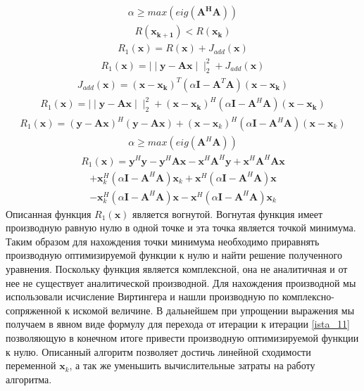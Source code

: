  \begin{align}
 \alpha \geq max(eig(\mathbf{A^HA}))
 \end{align}
 \begin{align}
 R(\mathbf{x_{k+1}})<R(\mathbf{x_k})
 \label{ista_3}
 \end{align}
\begin{align}
 R_1(\mathbf{x})=R(\mathbf{x})+J_{add}(\mathbf{x}) \label{ista_4}
\end{align}
\begin{align}
 R_1(\mathbf{x})=\mid\mid\mathbf{y}-\mathbf{Ax}\mid\mid^2_2+J_{add}(\mathbf{x})\label{ista_5}
\end{align}
\begin{align}
J_{add}(\mathbf{x})=(\mathbf{x-x_k})^T(\alpha \mathbf{I}-\mathbf{A}^T\mathbf{A})(\mathbf{x-x_k})\label{ista_6}
\end{align}
\begin{align}
 R_1(\mathbf{x})=\mid\mid\mathbf{y}-\mathbf{Ax}\mid\mid^2_2+(\mathbf{x-x_k})^H(\alpha \mathbf{I}-\mathbf{A}^H\mathbf{A})(\mathbf{x-x_k}) \label{ista_7}
\end{align}
\begin{align}
 R_1(\mathbf{x})=(\mathbf{y}-\mathbf{Ax})^H(\mathbf{y}-\mathbf{Ax})+(\mathbf{x}-\mathbf{x}_k)^H(\alpha \mathbf{I}-\mathbf{A}^H\mathbf{A})(\mathbf{x}-\mathbf{x}_k) \label{ista_8}
\end{align}
\begin{align}
\alpha \geq max(eig(\mathbf{A}^H\mathbf{A})) \label{ista_9}
\end{align}
\begin{align}
R_1(\mathbf{x})=\mathbf{y}^H\mathbf{y} -\mathbf{y}^H\mathbf{A}\mathbf{x} -\mathbf{x}^H \mathbf{A}^H\mathbf{y} +\mathbf{x}^H\mathbf{A}^H\mathbf{A}\mathbf{x} \label{ista_10}
\end{align}
\begin{align*}
 +\mathbf{x}_k^H(\alpha \mathbf{I}-\mathbf{A}^H\mathbf{A})\mathbf{x}_k +\mathbf{x}^H(\alpha \mathbf{I}-\mathbf{A}^H\mathbf{A})\mathbf{x} 
\end{align*}
\begin{align*}
-\mathbf{x}_k^H(\alpha \mathbf{I}-\mathbf{A}^H\mathbf{A})\mathbf{x} -\mathbf{x}^H(\alpha \mathbf{I}-\mathbf{A}^H\mathbf{A})\mathbf{x}_k 
\end{align*}
Описанная функция $ R_1(\mathbf{x})$ является вогнутой. Вогнутая функция имеет производную равную нулю в одной точке и эта точка является точкой минимума. Таким образом для нахождения точки минимума необходимо приравнять производную оптимизируемой функции к нулю и найти решение полученного уравнения. Поскольку функция является комплексной, она не аналитичная и от нее не существует аналитической производной. Для нахождения производной мы использовали  исчисление Виртингера\cite{Book27} и нашли производную по комплексно-сопряженной к искомой величине. В дальнейшем при упрощении выражения мы получаем в явном виде формулу для перехода от итерации к итерации \eqref{ista_11} позволяющую в конечном итоге привести производную оптимизируемой функции к нулю. Описанный алгоритм позволяет достичь линейной сходимости переменной $\mathbf{x}_k$, а так же уменьшить вычислительные затраты на работу алгоритма\cite{Book24}. 
